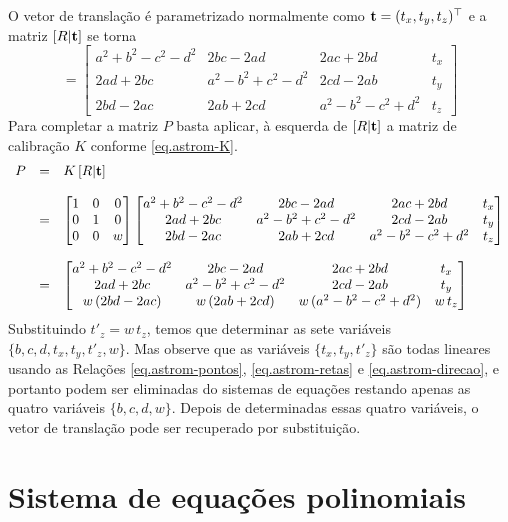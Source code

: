 O vetor de translação é parametrizado normalmente como ${\bf t}=(t_x,t_y,t_z)^\top$ e a matriz $[R|{\bf t}]$ se torna
\begin{equation*}
[R|{\bf t}]=
\begin{bmatrix}
a^2+b^2-c^2-d^2&2bc-2ad&2ac+2bd&t_x\\
2ad+2bc&a^2-b^2+c^2-d^2&2cd-2ab&t_y\\
2bd-2ac&2ab+2cd&a^2-b^2-c^2+d^2&t_z
\end{bmatrix}
\end{equation*}
Para completar a matriz $P$ basta aplicar, à esquerda de $[R|{\bf t}]$ a matriz de calibração $K$ conforme \ref{eq.astrom-K}.
\begin{equation*}
\begin{array}{rcl}
P&=&K\,[R|{\bf t}]\\\\
&=&
\begin{bmatrix}
1&0&0\\
0&1&0\\
0&0&w
\end{bmatrix}
\begin{bmatrix}
a^2+b^2-c^2-d^2&2bc-2ad&2ac+2bd&t_x\\
2ad+2bc&a^2-b^2+c^2-d^2&2cd-2ab&t_y\\
2bd-2ac&2ab+2cd&a^2-b^2-c^2+d^2&t_z
\end{bmatrix}\\\\
&=&
\begin{bmatrix}
a^2+b^2-c^2-d^2&2bc-2ad&2ac+2bd&t_x\\
2ad+2bc&a^2-b^2+c^2-d^2&2cd-2ab&t_y\\
w\,(2bd-2ac)&w\,(2ab+2cd)&w\,(a^2-b^2-c^2+d^2)&w\,t_z
\end{bmatrix}
\end{array}
\end{equation*} 
Substituindo $t'_z=w\,t_z$, temos que determinar as sete variáveis $\{b,c,d,t_x,t_y,t'_z,w\}$. Mas observe que as variáveis $\{t_x,t_y,t'_z\}$ são todas lineares usando as Relações \ref{eq.astrom-pontos}, \ref{eq.astrom-retas} e \ref{eq.astrom-direcao}, e portanto podem ser eliminadas do sistemas de equações restando apenas as quatro variáveis $\{b,c,d,w\}$. Depois de determinadas essas quatro variáveis, o vetor de translação pode ser recuperado por substituição. 
\section{Sistema de equações polinomiais}

